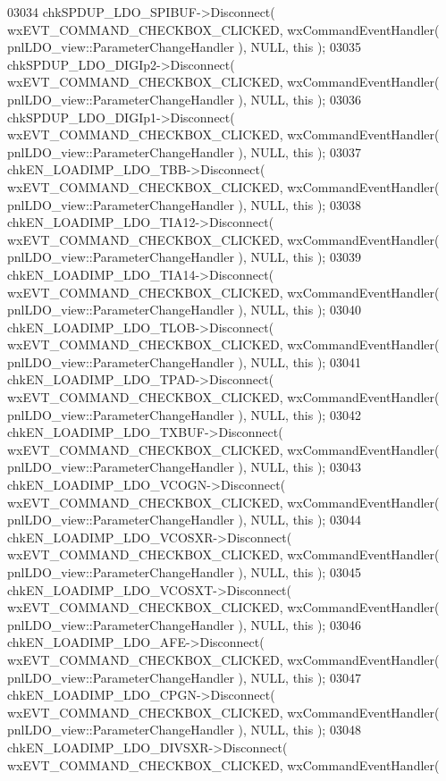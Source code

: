 \begin{DoxyCode}
03034     chkSPDUP_LDO_SPIBUF->Disconnect( wxEVT\_COMMAND\_CHECKBOX\_CLICKED, wxCommandEventHandler( 
      pnlLDO_view::ParameterChangeHandler ), NULL, \textcolor{keyword}{this} );
03035     chkSPDUP_LDO_DIGIp2->Disconnect( wxEVT\_COMMAND\_CHECKBOX\_CLICKED, wxCommandEventHandler( 
      pnlLDO_view::ParameterChangeHandler ), NULL, \textcolor{keyword}{this} );
03036     chkSPDUP_LDO_DIGIp1->Disconnect( wxEVT\_COMMAND\_CHECKBOX\_CLICKED, wxCommandEventHandler( 
      pnlLDO_view::ParameterChangeHandler ), NULL, \textcolor{keyword}{this} );
03037     chkEN_LOADIMP_LDO_TBB->Disconnect( wxEVT\_COMMAND\_CHECKBOX\_CLICKED, wxCommandEventHandler( 
      pnlLDO_view::ParameterChangeHandler ), NULL, \textcolor{keyword}{this} );
03038     chkEN_LOADIMP_LDO_TIA12->Disconnect( wxEVT\_COMMAND\_CHECKBOX\_CLICKED, wxCommandEventHandler( 
      pnlLDO_view::ParameterChangeHandler ), NULL, \textcolor{keyword}{this} );
03039     chkEN_LOADIMP_LDO_TIA14->Disconnect( wxEVT\_COMMAND\_CHECKBOX\_CLICKED, wxCommandEventHandler( 
      pnlLDO_view::ParameterChangeHandler ), NULL, \textcolor{keyword}{this} );
03040     chkEN_LOADIMP_LDO_TLOB->Disconnect( wxEVT\_COMMAND\_CHECKBOX\_CLICKED, wxCommandEventHandler( 
      pnlLDO_view::ParameterChangeHandler ), NULL, \textcolor{keyword}{this} );
03041     chkEN_LOADIMP_LDO_TPAD->Disconnect( wxEVT\_COMMAND\_CHECKBOX\_CLICKED, wxCommandEventHandler( 
      pnlLDO_view::ParameterChangeHandler ), NULL, \textcolor{keyword}{this} );
03042     chkEN_LOADIMP_LDO_TXBUF->Disconnect( wxEVT\_COMMAND\_CHECKBOX\_CLICKED, wxCommandEventHandler( 
      pnlLDO_view::ParameterChangeHandler ), NULL, \textcolor{keyword}{this} );
03043     chkEN_LOADIMP_LDO_VCOGN->Disconnect( wxEVT\_COMMAND\_CHECKBOX\_CLICKED, wxCommandEventHandler( 
      pnlLDO_view::ParameterChangeHandler ), NULL, \textcolor{keyword}{this} );
03044     chkEN_LOADIMP_LDO_VCOSXR->Disconnect( wxEVT\_COMMAND\_CHECKBOX\_CLICKED, wxCommandEventHandler( 
      pnlLDO_view::ParameterChangeHandler ), NULL, \textcolor{keyword}{this} );
03045     chkEN_LOADIMP_LDO_VCOSXT->Disconnect( wxEVT\_COMMAND\_CHECKBOX\_CLICKED, wxCommandEventHandler( 
      pnlLDO_view::ParameterChangeHandler ), NULL, \textcolor{keyword}{this} );
03046     chkEN_LOADIMP_LDO_AFE->Disconnect( wxEVT\_COMMAND\_CHECKBOX\_CLICKED, wxCommandEventHandler( 
      pnlLDO_view::ParameterChangeHandler ), NULL, \textcolor{keyword}{this} );
03047     chkEN_LOADIMP_LDO_CPGN->Disconnect( wxEVT\_COMMAND\_CHECKBOX\_CLICKED, wxCommandEventHandler( 
      pnlLDO_view::ParameterChangeHandler ), NULL, \textcolor{keyword}{this} );
03048     chkEN_LOADIMP_LDO_DIVSXR->Disconnect( wxEVT\_COMMAND\_CHECKBOX\_CLICKED, wxCommandEventHandler( 

\end{DoxyCode}
